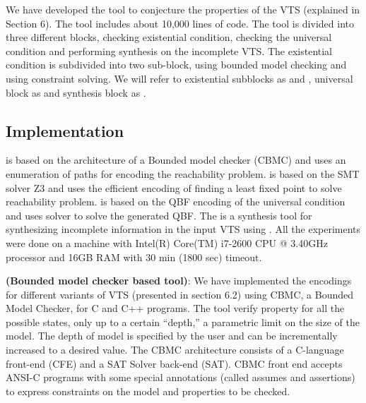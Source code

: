 %

%
We have developed the {\vtstool} tool to conjecture the properties of the VTS (explained in Section 6). 
%
%
The {\vtstool} tool includes about 10,000 lines of code.
%
The tool is divided into three different blocks,
%
checking existential condition, checking the universal condition and performing synthesis on the incomplete VTS. 
%
The existential condition is subdivided into two sub-block, using bounded model checking and using constraint solving. 
%
We will refer to existential subblocks as {\sattool} and {\smttool}, universal block as {\qbftool} and synthesis block as {\ourtool}.
%


\subsection{Implementation}
{\sattool} is based on the architecture of a Bounded model checker (CBMC) and uses an enumeration of paths for encoding the reachability problem.
%
{\smttool} is based on the SMT solver Z3 and uses the efficient encoding of finding a least fixed point to solve reachability problem. 
%
{\qbftool} is based on the QBF encoding of the universal condition and uses {\depqbf} solver to solve the generated QBF. 
%
The {\ourtool} is a synthesis tool for synthesizing incomplete information in the input VTS using {\qbftool}.
%
All the experiments were done on a machine with  Intel(R) Core(TM) i7-2600 CPU @ 3.40GHz processor and 16GB RAM with 30 min (1800 sec) timeout.

%

%

\textbf{{\sattool} (Bounded model checker based tool)}:
	We have implemented the encodings for different variants of VTS (presented in section 6.2) using CBMC, a Bounded Model Checker, for C and C++ programs. 
%
%
The tool verify property for all the possible states, only up to a certain “depth,” a parametric limit on the size of the model.
%
The depth of model is specified by the user and can be  incrementally increased to a desired value.
%
The CBMC architecture consists of a C-language front-end (CFE) and a SAT Solver back-end (SAT). 
%
CBMC front end accepts ANSI-C programs with some special annotations (called assumes and assertions) to express constraints on the model and properties to be checked. 
%	


